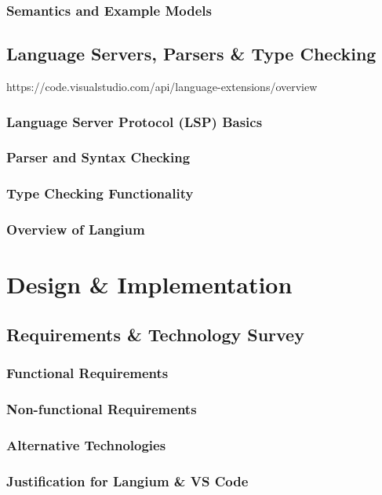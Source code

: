 \documentclass[11pt]{report}
\begin{document}
\section{Semantics and Example Models}

\chapter{Language Servers, Parsers \& Type Checking}
https://code.visualstudio.com/api/language-extensions/overview
\section{Language Server Protocol (LSP) Basics}
\section{Parser and Syntax Checking}
\section{Type Checking Functionality}
\section{Overview of Langium}

\part{Design \& Implementation}

\chapter{Requirements \& Technology Survey}
\section{Functional Requirements}
\section{Non-functional Requirements}
\section{Alternative Technologies}
\section{Justification for Langium \& VS Code}
\end{document}
